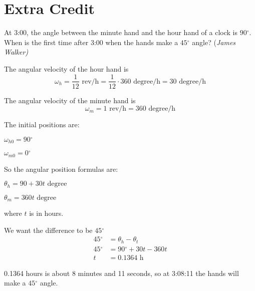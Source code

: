 \documentclass{exam}
\newcommand{\degree}{\ensuremath{^\circ}}
\begin{document}
\begin{questions}
\begin{solution}
\end{solution}

\section{Extra Credit}

\question 

At 3:00, the angle between the minute hand and the hour hand of a clock is $90 \degree$.
When is the first time after 3:00 when the hands make a $45 \degree$ angle? (\em{James Walker})

\begin{solution}

The angular velocity of the hour hand is 
\[
  \omega_h = \frac{1}{12} \text{ rev/h} = \frac{1}{12} \cdot 360 \text{ degree/h} = 30 \text{ degree/h}  
\]

The angular velocity of the minute hand is 
\[
  \omega_m = 1 \text{ rev/h} = 360 \text{ degree/h}
\]

The initial positions are:
\begin{itemize*}
  \item $\omega_{h0} = 90 \degree$
  \item $\omega_{m0} = 0 \degree$
\end{itemize*}

So the angular position formulas are:
\begin{itemize*}
  \item $\theta_h = 90 + 30t \text{ degree}$
  \item $\theta_m = 360t \text{ degree}$
\end{itemize*}
where $t$ is in hours.

We want the difference to be $45 \degree$ 
\begin{align*}
  45 \degree &= \theta_h - \theta_t \\
  45 \degree &= 90\degree + 30t - 360t \\
  t &= 0.1364 \text{ h}
\end{align*}

0.1364 hours is about 8 minutes and 11 seconds, so at 3:08:11 the hands will make a $45 \degree$ angle.

\end{solution}

\end{questions}

\ifprintanswers

\pagebreak
\end{document}
